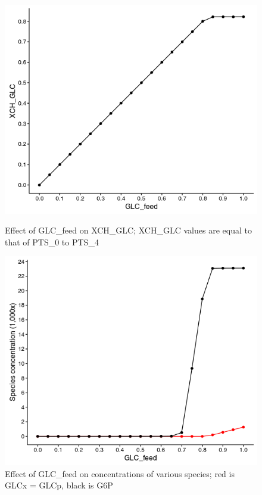 \documentclass[parskip=full, numbers=noenddot]{scrreprt}
\begin{document}
\begin{figure}[hp]
  \centering
  \includegraphics[scale=0.5]{growthglc_XCHGLCvGLCfeed}
  \caption{Effect of GLC\_feed on XCH\_GLC; XCH\_GLC values are equal to that of PTS\_0 to PTS\_4}
  \label{fig:growthglc_XCHGLCvGLCfeed}

  \includegraphics[scale=0.5]{growthglc_species}
  \caption{Effect of GLC\_feed on concentrations of various species; red is GLCx = GLCp, black is G6P}
  \label{fig:growthglc_species}
\end{figure}
\end{document}
